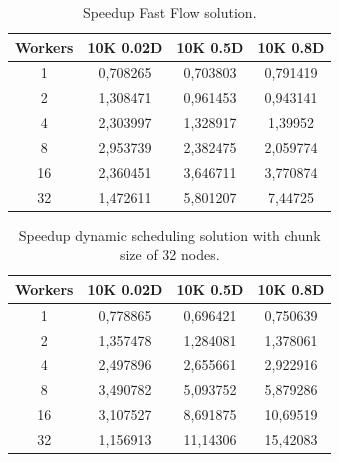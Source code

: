 \begin{table}[htb!]
\centering
\begin{tabular}{|c|c|c|c|}
\hline
Workers & 10K 0.02D & 10K 0.5D & 10K 0.8D \\ \hline
1       & 0,708265  & 0,703803 & 0,791419 \\ \hline
2       & 1,308471  & 0,961453 & 0,943141 \\ \hline
4       & 2,303997  & 1,328917 & 1,39952  \\ \hline
8       & 2,953739  & 2,382475 & 2,059774 \\ \hline
16      & 2,360451  & 3,646711 & 3,770874 \\ \hline
32      & 1,472611  & 5,801207 & 7,44725  \\ \hline
\end{tabular}
\caption{Speedup Fast Flow solution.}
\label{table:spup_ff}
\end{table}
\FloatBarrier

\begin{table}[htb!]
\centering
\begin{tabular}{|c|c|c|c|}
\hline
Workers & 10K 0.02D & 10K 0.5D & 10K 0.8D \\ \hline
1       & 0,778865  & 0,696421 & 0,750639 \\ \hline
2       & 1,357478  & 1,284081 & 1,378061 \\ \hline
4       & 2,497896  & 2,655661 & 2,922916 \\ \hline
8       & 3,490782  & 5,093752 & 5,879286 \\ \hline
16      & 3,107527  & 8,691875 & 10,69519 \\ \hline
32      & 1,156913  & 11,14306 & 15,42083 \\ \hline
\end{tabular}
\caption{Speedup dynamic scheduling solution with chunk size of 32 nodes.}
\label{table:spup_dy}
\end{table}
\FloatBarrier